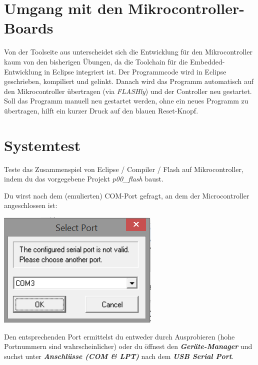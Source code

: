 


\newcommand{\tag}{5}

\cppSetTitle


	
\cppSetHeaderAndMakeTitle 


\section{Umgang mit den Mikrocontroller-Boards}

Von der Toolseite aus unterscheidet sich die Entwicklung für den Mikrocontroller kaum von den bisherigen Übungen, da die Toolchain für die Embedded-Entwicklung in Eclipse integriert ist.
Der Programmcode wird in Eclipse geschrieben, kompiliert und gelinkt.
Danach wird das Programm automatisch auf den Mikrocontroller übertragen (via \emph{FLASHly}) und der Controller neu gestartet.
Soll das Programm manuell neu gestartet werden, ohne ein neues Programm zu übertragen, hilft ein kurzer Druck auf den blauen Reset-Knopf.


\section{Systemtest}

Teste das Zusammenspiel von Eclipse / Compiler / Flash auf Mikrocontroller, indem du das vorgegebene Projekt \emph{p00\_flash} baust.

Du wirst nach dem (emulierten) COM-Port gefragt, an dem der Microcontroller angeschlossen ist:
\begin{center}
	\includegraphics[scale=.7]{com_port_drop_down.png}
\end{center}
Den entsprechenden Port ermittelst du entweder durch Ausprobieren (hohe Portnummern sind wahrscheinlicher) oder du öffnest den \emph{\textbf{Geräte-Manager}} und suchst unter \textbf{\emph{Anschlüsse (COM \& LPT)}} nach dem \emph{\textbf{USB Serial Port}}. 


